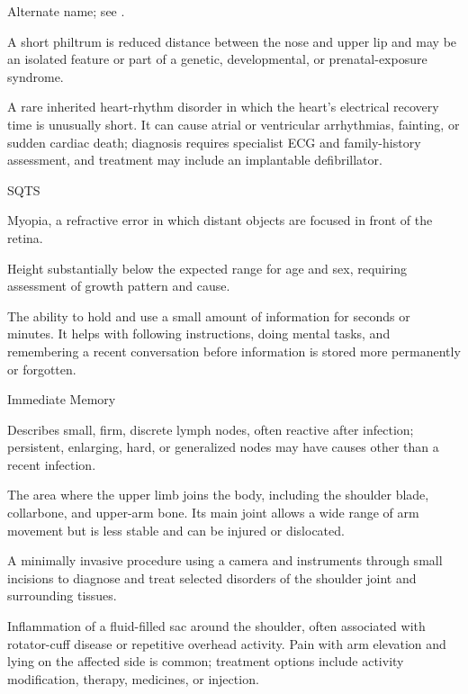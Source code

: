  Alternate name; see .

 A short philtrum is reduced distance between the nose and upper lip and may be an isolated feature or part of a genetic, developmental, or prenatal-exposure syndrome.

 A rare inherited heart-rhythm disorder in which the heart's electrical recovery time is unusually short. It can cause atrial or ventricular arrhythmias, fainting, or sudden cardiac death; diagnosis requires specialist ECG and family-history assessment, and treatment may include an implantable defibrillator.

\synonyms
SQTS

 Myopia, a refractive error in which distant objects are focused in front of the retina.

 Height substantially below the expected range for age and sex, requiring assessment of growth pattern and cause.

 The ability to hold and use a small amount of information for seconds or minutes. It helps with following instructions, doing mental tasks, and remembering a recent conversation before information is stored more permanently or forgotten.

\synonyms
Immediate Memory

 Describes small, firm, discrete lymph nodes, often reactive after infection; persistent, enlarging, hard, or generalized nodes may have causes other than a recent infection.

 The area where the upper limb joins the body, including the shoulder blade, collarbone, and upper-arm bone. Its main joint allows a wide range of arm movement but is less stable and can be injured or dislocated.

 A minimally invasive procedure using a camera and instruments through small incisions to diagnose and treat selected disorders of the shoulder joint and surrounding tissues.

 Inflammation of a fluid-filled sac around the shoulder, often associated with rotator-cuff disease or repetitive overhead activity. Pain with arm elevation and lying on the affected side is common; treatment options include activity modification, therapy, medicines, or injection.

